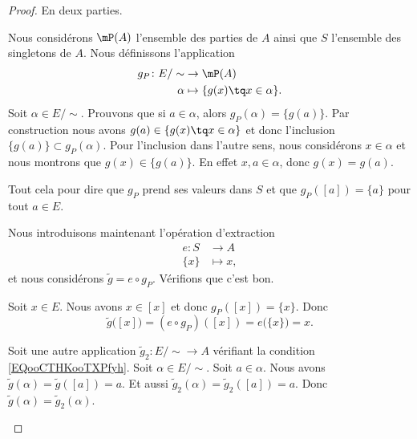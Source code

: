 \begin{proof}
	En deux parties.
	\begin{subproof}
		\spitem[Existence]

		Nous considérons \( \mP(A)\) l'ensemble des parties de \( A\) ainsi que \( S\) l'ensemble des singletons de \( A\). Nous définissons l'application
		\begin{equation}
			\begin{aligned}
				g_P\colon E/\sim & \to \mP(A)                         \\
				\alpha           & \mapsto \{ g(x)\tq x\in \alpha \}.
			\end{aligned}
		\end{equation}
		Soit \( \alpha\in E/\sim\). Prouvons que si \( a\in \alpha\), alors \( g_P(\alpha)=\{ g(a) \}\). Par construction nous avons \( g(a)\in \{ g(x)\tq x\in \alpha \}\) et donc l'inclusion \( \{ g(a) \}\subset g_P(\alpha)\). Pour l'inclusion dans l'autre sens, nous considérons \( x\in \alpha\) et nous montrons que \( g(x)\in\{ g(a) \}\). En effet \( x,a\in \alpha\), donc \( g(x)=g(a)\).

		Tout cela pour dire que \( g_P\) prend ses valeurs dans \( S\) et que \( g_P([a])=\{ a \}\) pour tout \( a\in E\).

		Nous introduisons maintenant l'opération d'extraction
		\begin{equation}
			\begin{aligned}
				e\colon S & \to A      \\
				\{ x \}   & \mapsto x,
			\end{aligned}
		\end{equation}
		et nous considérons \( \tilde g=e\circ g_P\). Vérifions que c'est bon.

		Soit \( x\in E\). Nous avons \( x\in[x]\) et donc \( g_P([x])=\{ x \}\). Donc
		\begin{equation}
			\tilde g\big( [x] \big)=(e\circ g_P)([x])=e\big( \{ x \} \big)=x.
		\end{equation}

		\spitem[Unicité]
		Soit une autre application \(\tilde g_2 \colon E/\sim\to A  \) vérifiant la condition \eqref{EQooCTHKooTXPfyh}. Soit \( \alpha\in E/\sim\). Soit \( a\in \alpha\). Nous avons \( \tilde g(\alpha)=\tilde g([a])=a\). Et aussi \( \tilde g_2(\alpha)=\tilde g_2([a])=a\). Donc \( \tilde g(\alpha)=\tilde g_2(\alpha)\).
	\end{subproof}
\end{proof}

